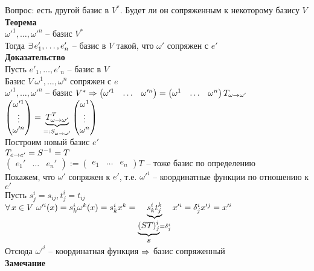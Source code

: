 \documentclass[12pt]{article}
\begin{document}
Вопрос: есть другой базис в $V^*$. Будет ли он сопряженным к некоторому базису $V$\\
\textbf{Теорема}\\
$\omega'^1, \ldots, \omega'^n$ -- базис $V^*$\\
Тогда $\ex e'_1, \ldots, e'_n$ -- базис в $V$ такой, что $\omega'$ сопряжен с $e'$\\
\textbf{Доказательство}\\
Пусть $e'_1, \ldots, e'_n$ -- базис в $V$\\
Базис $V\ \omega^1, \ldots, \omega^n$ сопряжен с $e$\\
$\omega'^1, \ldots, \omega'^n$ -- базис $V^* \Rto \begin{pmatrix}
    \omega'^1 & \ldots & \omega'^n
\end{pmatrix} = \begin{pmatrix}
    \omega^1 & \ldots & \omega^n
\end{pmatrix}T_{\omega \rto \omega'}$\\
$\begin{pmatrix}
    \omega'^1\\\vdots\\\omega'^n
\end{pmatrix} = \ub{=:S_{\omega \rto \omega'}}{T_{\omega \rto \omega'}^T}\begin{pmatrix}
    \omega^1\\\vdots\\\omega^n
\end{pmatrix}$\\
Построим новый базис $e'$\\
$T_{e\rto e'} = S^{-1} = T$\\
$\begin{pmatrix}
    e_1' & \ldots & e_n'
\end{pmatrix}:= \begin{pmatrix}
    e_1 & \ldots & e_n
\end{pmatrix}T$ -- тоже базис по определению\\
Покажем, что $\omega'$ сопряжен к $e'$, т.е. $\omega'^i$ -- координатные функции по отношению к $e'$\\
Пусть $s^i_j = s_{ij}, t^i_j = t_{ij}$\\
$\fall x\in V\ \omega'^i(x) = s^i_k\omega^k(x) = s^i_k x^k = \ub{\ub{E}{(ST)_j^i} = \delta_j^i}{s^i_k t_j^k} x'^i = \delta^i_j x'^j = x'^i$\\
Отсюда $\omega'^i$ -- координатная функция $\Rto$ базис сопряженный\\
\textbf{Замечание}\\
\end{document}
